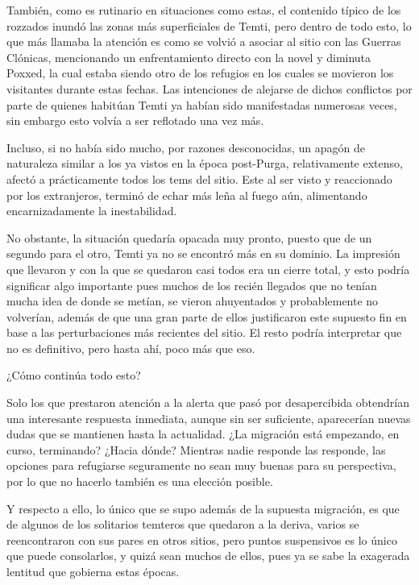\documentclass[
  spanish,
]{book}
\begin{document}
También, como es rutinario en situaciones como estas, el contenido típico de los rozzados inundó las zonas más superficiales de Temti, pero dentro de todo esto, lo que más llamaba la atención es como se volvió a asociar al sitio con las Guerras Clónicas, mencionando un enfrentamiento directo con la novel y diminuta Poxxed, la cual estaba siendo otro de los refugios en los cuales se movieron los visitantes durante estas fechas. Las intenciones de alejarse de dichos conflictos por parte de quienes habitúan Temti ya habían sido manifestadas numerosas veces, sin embargo esto volvía a ser reflotado una vez más.

Incluso, si no había sido mucho, por razones desconocidas, un apagón de naturaleza similar a los ya vistos en la época post-Purga, relativamente extenso, afectó a prácticamente todos los tems del sitio. Este al ser visto y reaccionado por los extranjeros, terminó de echar más leña al fuego aún, alimentando encarnizadamente la inestabilidad.

No obstante, la situación quedaría opacada muy pronto, puesto que de un segundo para el otro, Temti ya no se encontró más en su dominio. La impresión que llevaron y con la que se quedaron casi todos era un cierre total, y esto podría significar algo importante pues muchos de los recién llegados que no tenían mucha idea de donde se metían, se vieron ahuyentados y probablemente no volverían, además de que una gran parte de ellos justificaron este supuesto fin en base a las perturbaciones más recientes del sitio. El resto podría interpretar que no es definitivo, pero hasta ahí, poco más que eso.

¿Cómo continúa todo esto?

Solo los que prestaron atención a la alerta que pasó por desapercibida obtendrían una interesante respuesta inmediata, aunque sin ser suficiente, aparecerían nuevas dudas que se mantienen hasta la actualidad. ¿La migración está empezando, en curso, terminando? ¿Hacia dónde? Mientras nadie responde las responde, las opciones para refugiarse seguramente no sean muy buenas para su perspectiva, por lo que no hacerlo también es una elección posible.

Y respecto a ello, lo único que se supo además de la supuesta migración, es que de algunos de los solitarios temteros que quedaron a la deriva, varios se reencontraron con sus pares en otros sitios, pero puntos suspensivos es lo único que puede consolarlos, y quizá sean muchos de ellos, pues ya se sabe la exagerada lentitud que gobierna estas épocas.
\end{document}
